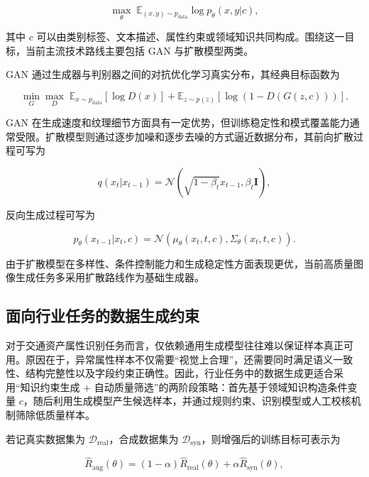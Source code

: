 \begin{equation}
\max_{\theta}\;\mathbb{E}_{(x,y)\sim p_{\text{data}}}\log p_{\theta}(x,y|c),
\end{equation}

其中 $c$ 可以由类别标签、文本描述、属性约束或领域知识共同构成。围绕这一目标，当前主流技术路线主要包括 GAN 与扩散模型两类。

GAN 通过生成器与判别器之间的对抗优化学习真实分布\cite{goodfellow2014gan}，其经典目标函数为

\begin{equation}
\min_{G}\max_{D}\;\mathbb{E}_{x\sim p_{\text{data}}}[\log D(x)]+\mathbb{E}_{z\sim p(z)}[\log(1-D(G(z,c)))].
\end{equation}

GAN 在生成速度和纹理细节方面具有一定优势，但训练稳定性和模式覆盖能力通常受限。扩散模型则通过逐步加噪和逐步去噪的方式逼近数据分布\cite{ho2020ddpm}，其前向扩散过程可写为

\begin{equation}
q(x_t|x_{t-1})=\mathcal{N}(\sqrt{1-\beta_t}x_{t-1},\beta_t\mathbf{I}),
\end{equation}

反向生成过程可写为

\begin{equation}
p_{\theta}(x_{t-1}|x_t,c)=\mathcal{N}(\mu_{\theta}(x_t,t,c),\Sigma_{\theta}(x_t,t,c)).
\end{equation}

由于扩散模型在多样性、条件控制能力和生成稳定性方面表现更优，当前高质量图像生成任务多采用扩散路线作为基础生成器。

\subsection{面向行业任务的数据生成约束}

对于交通资产属性识别任务而言，仅依赖通用生成模型往往难以保证样本真正可用。原因在于，异常属性样本不仅需要“视觉上合理”，还需要同时满足语义一致性、结构完整性以及字段约束正确性。因此，行业任务中的数据生成更适合采用“知识约束生成 + 自动质量筛选”的两阶段策略：首先基于领域知识构造条件变量 $c$，随后利用生成模型产生候选样本，并通过规则约束、识别模型或人工校核机制筛除低质量样本。

若记真实数据集为 $\mathcal{D}_{\text{real}}$，合成数据集为 $\mathcal{D}_{\text{syn}}$，则增强后的训练目标可表示为

\begin{equation}
\hat R_{\text{aug}}(\theta)=(1-\alpha)\hat R_{\text{real}}(\theta)+\alpha\hat R_{\text{syn}}(\theta),
\end{equation}

